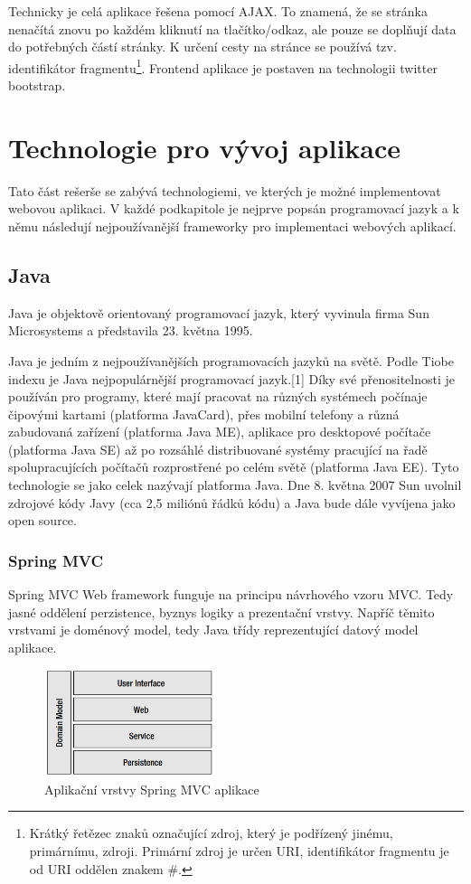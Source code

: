 Technicky je celá aplikace řešena pomocí AJAX. To znamená, že se stránka nenačítá znovu po každém kliknutí na tlačítko/odkaz, ale pouze se doplňují data do potřebných částí stránky. K určení cesty na stránce se používá tzv. identifikátor fragmentu\footnote{Krátký řetězec znaků označující zdroj, který je podřízený jinému, primárnímu, zdroji. Primární zdroj je určen URI, identifikátor fragmentu je od URI oddělen znakem \#.}. Frontend aplikace je postaven na technologii twitter bootstrap.

\section{Technologie pro vývoj aplikace}
Tato část rešerše se zabývá technologiemi, ve kterých je možné implementovat webovou aplikaci. V každé podkapitole je nejprve popsán programovací jazyk a k němu následují nejpoužívanější frameworky pro implementaci webových aplikací.
\subsection{Java}
Java je objektově orientovaný programovací jazyk, který vyvinula firma Sun Microsystems a představila 23. května 1995.

Java je jedním z nejpoužívanějších programovacích jazyků na světě. Podle Tiobe indexu je Java nejpopulárnější programovací jazyk.[1] Díky své přenositelnosti je používán pro programy, které mají pracovat na různých systémech počínaje čipovými kartami (platforma JavaCard), přes mobilní telefony a různá zabudovaná zařízení (platforma Java ME), aplikace pro desktopové počítače (platforma Java SE) až po rozsáhlé distribuované systémy pracující na řadě spolupracujících počítačů rozprostřené po celém světě (platforma Java EE). Tyto technologie se jako celek nazývají platforma Java. Dne 8. května 2007 Sun uvolnil zdrojové kódy Javy (cca 2,5 miliónů řádků kódu) a Java bude dále vyvíjena jako open source.
\subsubsection{Spring MVC}
Spring MVC Web framework funguje na principu návrhového vzoru MVC. Tedy jasné oddělení perzistence, byznys logiky a prezentační vrstvy. Napříč těmito vrstvami je doménový model, tedy Java třídy reprezentující datový model aplikace\cite{liu2006research}.

\begin{figure}[htb]
\begin{center}
\includegraphics[width=50mm]{./pictures/spring-mvc-layers.png}
\caption{Aplikační vrstvy Spring MVC aplikace \cite{liu2006research}}
\label{fig:spring-mvc-layers}
\end{center}
\end{figure}

